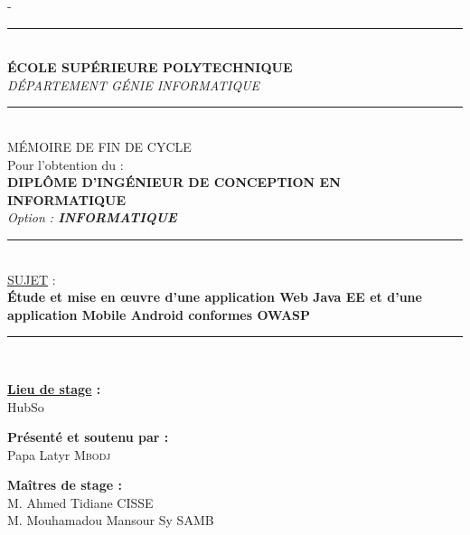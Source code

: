 \begin{titlingpage}
\begin{SingleSpace}
\begin{adjustwidth*}{\unitlength}{-\unitlength}
\begin{center}
				\vspace{5mm}
				\hrule~\\[0.2cm]
				\vspace{5mm}
				{\large \textbf{ÉCOLE SUPÉRIEURE POLYTECHNIQUE} }\\
				{\large \textit{DÉPARTEMENT GÉNIE INFORMATIQUE} }\\
				\vspace{5mm}
				\hrule~\\[0.2cm]
				\vspace{5mm}
				{\large MÉMOIRE DE FIN DE CYCLE }~\\[0.1cm]
				{\large Pour l'obtention du : }~\\[0.1cm]
				{\large \textbf{DIPLÔME D'INGÉNIEUR DE CONCEPTION EN INFORMATIQUE} }~\\[0.1cm]
				{\large \textit{Option : \textbf{INFORMATIQUE}} }~\\[0.1cm]
				\vspace{5mm}
				\hrule~\\[0.1cm]
				\vspace{5mm}
				{\large \underline{SUJET} : }~\\[0.1cm]
				\vspace{3mm}
				\textbf{\huge Étude et mise en œuvre d'une application Web Java EE et d'une application Mobile Android conformes OWASP }\\[4mm]
				\vspace{5mm}
				\hrule~\\[0.1cm]
				\vspace{5mm}
				\begin{center}
					{\textbf{\underline{Lieu de stage} :}}\\
					HubSo\\
				\end{center}
				\vspace{12mm}
				\begin{minipage}[t]{0.33333\textwidth}
					\centering
					{\textbf{Présenté et soutenu par :}}\\
					Papa Latyr \textsc{Mbodj}\\
				\end{minipage}%
				\begin{minipage}[t]{0.33333\textwidth}
					\centering
					{\textbf{Maîtres de stage : }}\\
					{{M. Ahmed Tidiane CISSE}}\\
					{{M. Mouhamadou Mansour Sy SAMB}}\\
				\end{minipage}%

\end{center}
\end{adjustwidth*}
\end{SingleSpace}
\end{titlingpage}
